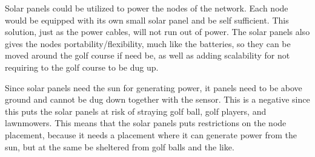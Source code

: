Solar panels could be utilized to power the nodes of the network. Each node would be equipped with its own small solar panel and be self sufficient. This solution, just as the power cables, will not run out of power. The solar panels also gives the nodes portability/flexibility, much like the batteries, so they can be moved around the golf course if need be, as well as adding scalability for not requiring to the golf course to be dug up.

Since solar panels need the sun for generating power, it panels need to be above ground and cannot be dug down together with the sensor. This is a negative since this puts the solar panels at risk of straying golf ball, golf players, and lawnmowers. This means that the solar panels puts restrictions on the node placement, because it needs a placement where it can generate power from the sun, but at the same be sheltered from golf balls and the like.
